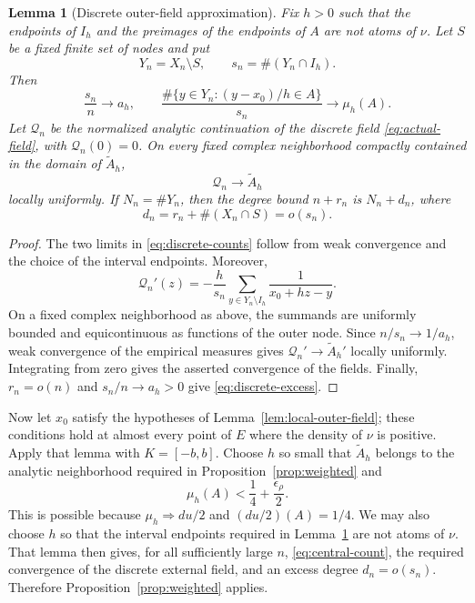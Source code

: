 \documentclass[11pt]{article}
\newtheorem{lemma}[theorem]{Lemma}
\theoremstyle{definition}
\numberwithin{equation}{section}
\begin{document}
\begin{lemma}[Discrete outer-field approximation]\label{lem:discrete-field}
Fix \(h>0\) such that the endpoints of \(I_h\) and the preimages of
the endpoints of \(A\) are not atoms of \(\nu\). Let \(S\) be a fixed
finite set of nodes and put
\[
 Y_n=X_n\setminus S,\qquad s_n=\#(Y_n\cap I_h).
\]
Then
\begin{equation}\label{eq:discrete-counts}
 \frac{s_n}{n}\longrightarrow a_h,
 \qquad
 \frac{\#\{y\in Y_n:(y-x_0)/h\in A\}}{s_n}
 \longrightarrow\mu_h(A).
\end{equation}
Let \(\mathcal Q_n\) be the normalized analytic continuation of the
discrete field \eqref{eq:actual-field}, with \(\mathcal Q_n(0)=0\).
On every fixed complex neighborhood compactly contained in the domain
of \(\widetilde A_h\),
\[
 \mathcal Q_n\longrightarrow\widetilde A_h
\]
locally uniformly. If \(N_n=\#Y_n\), then the degree bound \(n+r_n\)
is \(N_n+d_n\), where
\begin{equation}\label{eq:discrete-excess}
 d_n=r_n+\#(X_n\cap S)=o(s_n).
\end{equation}
\end{lemma}

\begin{proof}
The two limits in \eqref{eq:discrete-counts} follow from weak
convergence and the choice of the interval endpoints. Moreover,
\[
 \mathcal Q_n'(z)
 =-\frac{h}{s_n}\sum_{y\in Y_n\setminus I_h}
   \frac1{x_0+hz-y}.
\]
On a fixed complex neighborhood as above, the summands are uniformly
bounded and equicontinuous as functions of the outer node. Since
\(n/s_n\to1/a_h\), weak convergence of the empirical measures gives
\(\mathcal Q_n'\to\widetilde A_h'\) locally uniformly. Integrating
from zero gives the asserted convergence of the fields. Finally,
\(r_n=o(n)\) and \(s_n/n\to a_h>0\) give
\eqref{eq:discrete-excess}.
\end{proof}

Now let \(x_0\) satisfy the hypotheses of Lemma~\ref{lem:local-outer-field};
these conditions hold at almost every point of \(E\) where the density
of \(\nu\) is positive. Apply that lemma with \(K=[-b,b]\). Choose
\(h\) so small that \(\widetilde A_h\) belongs to the analytic
neighborhood required in Proposition~\ref{prop:weighted} and
\[
 \mu_h(A)<\frac14+\frac{\epsilon_\rho}{2}.
\]
This is possible because \(\mu_h\Rightarrow du/2\) and
\((du/2)(A)=1/4\). We may also choose \(h\) so that the interval
endpoints required in Lemma~\ref{lem:discrete-field} are not atoms of
\(\nu\). That lemma then gives, for all sufficiently large \(n\),
\eqref{eq:central-count}, the required convergence of the discrete
external field, and an excess degree \(d_n=o(s_n)\). Therefore
Proposition~\ref{prop:weighted} applies.
\end{document}
